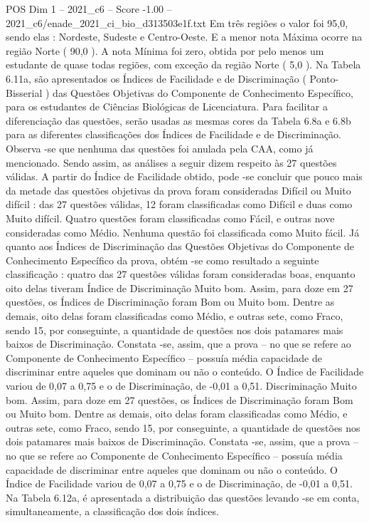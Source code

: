 \begin{textsample}{POS Dim 1 – 2021\_c6 – Score -1.00 – 2021\_c6/enade\_2021\_ci\_bio\_d313503e1f.txt}
Em três regiões o valor foi 95,0, sendo elas : Nordeste, Sudeste e Centro-Oeste.
E a menor nota Máxima ocorre na região Norte ( 90,0 ).
A nota Mínima foi zero, obtida por pelo menos um estudante de quase todas regiões, com exceção da região Norte ( 5,0 ).
Na Tabela 6.11a, são apresentados os Índices de Facilidade e de Discriminação ( Ponto-Bisserial ) das Questões Objetivas do Componente de Conhecimento Específico, para os estudantes de Ciências Biológicas de Licenciatura.
Para facilitar a diferenciação das questões, serão usadas as mesmas cores da Tabela 6.8a e 6.8b para as diferentes classificações dos Índices de Facilidade e de Discriminação.
Observa -se que nenhuma das questões foi anulada pela CAA, como já mencionado.
Sendo assim, as análises a seguir dizem respeito às 27 questões válidas.
A partir do Índice de Facilidade obtido, pode -se concluir que pouco mais da metade das questões objetivas da prova foram consideradas Difícil ou Muito difícil : das 27 questões válidas, 12 foram classificadas como Difícil e duas como Muito difícil.
Quatro questões foram classificadas como Fácil, e outras nove consideradas como Médio.
Nenhuma questão foi classificada como Muito fácil.
Já quanto aos Índices de Discriminação das Questões Objetivas do Componente de Conhecimento Específico da prova, obtém -se como resultado a seguinte classificação : quatro das 27 questões válidas foram consideradas boas, enquanto oito delas tiveram Índice de Discriminação Muito bom.
Assim, para doze em 27 questões, os Índices de Discriminação foram Bom ou Muito bom.
Dentre as demais, oito delas foram classificadas como Médio, e outras sete, como Fraco, sendo 15, por conseguinte, a quantidade de questões nos dois patamares mais baixos de Discriminação.
Constata -se, assim, que a prova – no que se refere ao Componente de Conhecimento Específico – possuía média capacidade de discriminar entre aqueles que dominam ou não o conteúdo.
O Índice de Facilidade variou de 0,07 a 0,75 e o de Discriminação, de -0,01 a 0,51.
Discriminação Muito bom.
Assim, para doze em 27 questões, os Índices de Discriminação foram Bom ou Muito bom.
Dentre as demais, oito delas foram classificadas como Médio, e outras sete, como Fraco, sendo 15, por conseguinte, a quantidade de questões nos dois patamares mais baixos de Discriminação.
Constata -se, assim, que a prova – no que se refere ao Componente de Conhecimento Específico – possuía média capacidade de discriminar entre aqueles que dominam ou não o conteúdo.
O Índice de Facilidade variou de 0,07 a 0,75 e o de Discriminação, de -0,01 a 0,51.
Na Tabela 6.12a, é apresentada a distribuição das questões levando -se em conta, simultaneamente, a classificação dos dois índices.

\end{textsample}
